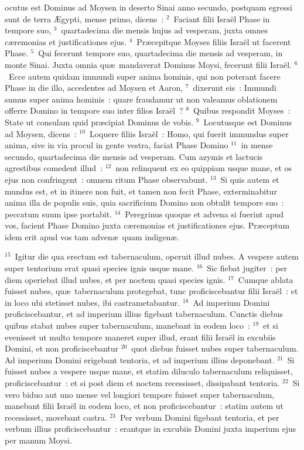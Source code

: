 \bchapter
{}ocutus est Dominus ad Moysen in deserto Sinai anno secundo, postquam egressi sunt de terra \AE gypti, mense primo, dicens~:
${}^{2}$~Faciant filii Isra\"el Phase in tempore suo,
${}^{3}$~quartadecima die mensis hujus ad vesperam, juxta omnes c\ae remonias et justificationes ejus.
${}^{4}$~Pr\ae cepitque Moyses filiis Isra\"el ut facerent Phase.
${}^{5}$~Qui fecerunt tempore suo, quartadecima die mensis ad vesperam, in monte Sinai. Juxta omnia qu\ae\ mandaverat Dominus Moysi, fecerunt filii Isra\"el.
${}^{6}$~Ecce autem quidam immundi super anima hominis, qui non poterant facere Phase in die illo, accedentes ad Moysen et Aaron,
${}^{7}$~dixerunt eis~: Immundi sumus super anima hominis~: quare fraudamur ut non valeamus oblationem offerre Domino in tempore suo inter filios Isra\"el~?
${}^{8}$~Quibus respondit Moyses~: State ut consulam quid pr\ae cipiat Dominus de vobis.
${}^{9}$~Locutusque est Dominus ad Moysen, dicens~:
${}^{10}$~Loquere filiis Isra\"el~: Homo, qui fuerit immundus super anima, sive in via procul in gente vestra, faciat Phase Domino
${}^{11}$~in mense secundo, quartadecima die mensis ad vesperam. Cum azymis et lactucis agrestibus comedent illud~:
${}^{12}$~non relinquent ex eo quippiam usque mane, et os ejus non confringent~: omnem ritum Phase observabunt.
${}^{13}$~Si quis autem et mundus est, et in itinere non fuit, et tamen non fecit Phase, exterminabitur anima illa de populis suis, quia sacrificium Domino non obtulit tempore suo~: peccatum suum ipse portabit.
${}^{14}$~Peregrinus quoque et advena si fuerint apud vos, facient Phase Domino juxta c\ae remonias et justificationes ejus. Pr\ae ceptum idem erit apud vos tam adven\ae\ quam indigen\ae .


${}^{15}$~Igitur die qua erectum est tabernaculum, operuit illud nubes. A vespere autem super tentorium erat quasi species ignis usque mane.
${}^{16}$~Sic fiebat jugiter~: per diem operiebat illud nubes, et per noctem quasi species ignis.
${}^{17}$~Cumque ablata fuisset nubes, qu\ae\ tabernaculum protegebat, tunc proficiscebantur filii Isra\"el~: et in loco ubi stetisset nubes, ibi castrametabantur.
${}^{18}$~Ad imperium Domini proficiscebantur, et ad imperium illius figebant tabernaculum. Cunctis diebus quibus stabat nubes super tabernaculum, manebant in eodem loco~:
${}^{19}$~et si evenisset ut multo tempore maneret super illud, erant filii Isra\"el in excubiis Domini, et non proficiscebantur
${}^{20}$~quot diebus fuisset nubes super tabernaculum. Ad imperium Domini erigebant tentoria, et ad imperium illius deponebant.
${}^{21}$~Si fuisset nubes a vespere usque mane, et statim diluculo tabernaculum reliquisset, proficiscebantur~: et si post diem et noctem recessisset, dissipabant tentoria.
${}^{22}$~Si vero biduo aut uno mense vel longiori tempore fuisset super tabernaculum, manebant filii Isra\"el in eodem loco, et non proficiscebantur~: statim autem ut recessisset, movebant castra.
${}^{23}$~Per verbum Domini figebant tentoria, et per verbum illius proficiscebantur~: erantque in excubiis Domini juxta imperium ejus per manum Moysi.

